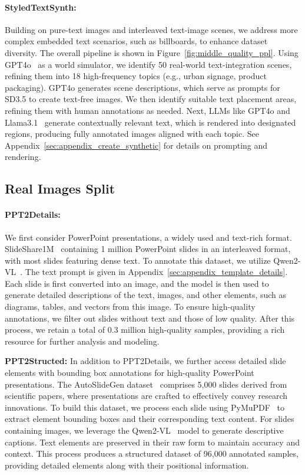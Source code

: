 \paragraph{StyledTextSynth:}
Building on pure-text images and interleaved text-image scenes, we address more complex embedded text scenarios, such as billboards, to enhance dataset diversity. The overall pipeline is shown in Figure~\ref{fig:middle_quality_ppl}.
Using GPT4o~\cite{gpt4o} as a world simulator, we identify 50 real-world text-integration scenes, refining them into 18 high-frequency topics (e.g., urban signage, product packaging). GPT4o generates scene descriptions, which serve as prompts for SD3.5 to create text-free images. We then identify suitable text placement areas, refining them with human annotations as needed.
Next, LLMs like GPT4o and Llama3.1~\cite{llama3h} generate contextually relevant text, which is rendered into designated regions, producing fully annotated images aligned with each topic. 
See Appendix~\ref{sec:appendix_create_synthetic} for details on prompting and rendering.



\subsection{Real Images Split}

\paragraph{PPT2Details:}
We first consider PowerPoint presentations, a widely used and text-rich format.
SlideShare1M~\cite{araujo2016slideshare} containing 1 million PowerPoint slides in an interleaved format, with most slides featuring dense text.
To annotate this dataset, we utilize Qwen2-VL~\cite{qwen2_vl}. 
The text prompt is given in Appendix~\ref{sec:appendix_template_details}.
Each slide is first converted into an image, and the model is then used to generate detailed descriptions of the text, images, and other elements, such as diagrams, tables, and vectors from this image.
To ensure high-quality annotations, we filter out slides without text and those of low quality. 
After this process, we retain a total of 0.3 million high-quality samples, providing a rich resource for further analysis and modeling.


\textbf{PPT2Structed:}
In addition to PPT2Details, we further access detailed slide elements with bounding box annotations for high-quality PowerPoint presentations. 
The AutoSlideGen dataset~\cite{autoslidegen} comprises 5,000 slides derived from scientific papers, where presentations are crafted to effectively convey research innovations.
To build this dataset, we process each slide using PyMuPDF~\cite{pymupdf} to extract element bounding boxes and their corresponding text content. 
For slides containing images, we leverage the Qwen2-VL~\cite{qwen2_vl} model to generate descriptive captions. Text elements are preserved in their raw form to maintain accuracy and context.
This process produces a structured dataset of 96,000 annotated samples, providing detailed elements along with their positional information.

